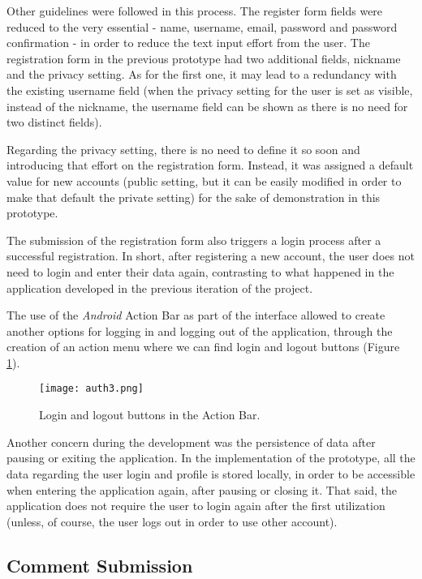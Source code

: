 Other guidelines were followed in this process. The register form fields were reduced to the very essential - name, username, email, password and password confirmation - in order to reduce the text input effort from the user. The registration form in the previous prototype had two additional fields, nickname and the privacy setting. As for the first one, it may lead to a redundancy with the existing username field (when the privacy setting for the user is set as visible, instead of the nickname, the username field can be shown as there is no need for two distinct fields). 

Regarding the privacy setting, there is no need to define it so soon and introducing that effort on the registration form. Instead, it was assigned a default value for new accounts (public setting, but it can be easily modified in order to make that default the private setting) for the sake of demonstration in this prototype.

The submission of the registration form also triggers a login process after a successful registration. In short, after registering a new account, the user does not need to login and enter their data again, contrasting to what happened in the application developed in the previous iteration of the project.

The use of the \emph{Android} Action Bar as part of the interface allowed to create another options for logging in and logging out of the application, through the creation of an action menu where we can find login and logout buttons (Figure \ref{fig:auth3}).

\begin{figure}[h!]
  \begin{center}
    \leavevmode
    \texttt{[image: auth3.png]}
    \caption{Login and logout buttons in the Action Bar.}
    \label{fig:auth3}
  \end{center}
\end{figure}

Another concern during the development was the persistence of data after pausing or exiting the application. In the implementation of the prototype, all the data regarding the user login and profile is stored locally, in order to be accessible when entering the application again, after pausing or closing it. That said, the application does not require the user to login again after the first utilization (unless, of course, the user logs out in order to use other account).

\subsection{Comment Submission}\label{comment}

